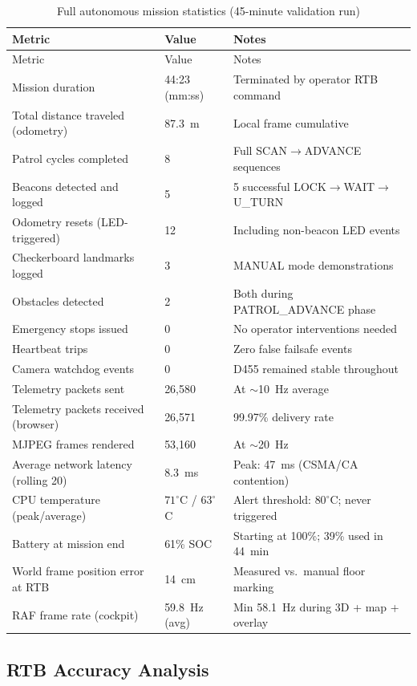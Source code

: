 \begin{longtable}{@{}p{5cm}p{2.6cm}p{5.8cm}@{}}
\caption{Full autonomous mission statistics (45-minute validation run)} \label{tab:full-mission-stats} \\
\toprule
Metric & Value & Notes \\
\midrule
\endfirsthead
\toprule
Metric & Value & Notes \\
\midrule
\endhead
Mission duration & 44:23 (mm:ss) & Terminated by operator RTB command \\
Total distance traveled (odometry) & 87.3~m & Local frame cumulative \\
Patrol cycles completed & 8 & Full SCAN$\to$ADVANCE sequences \\
Beacons detected and logged & 5 & 5 successful LOCK$\to$WAIT$\to$U\_TURN \\
Odometry resets (LED-triggered) & 12 & Including non-beacon LED events \\
Checkerboard landmarks logged & 3 & MANUAL mode demonstrations \\
Obstacles detected & 2 & Both during PATROL\_ADVANCE phase \\
Emergency stops issued & 0 & No operator interventions needed \\
Heartbeat trips & 0 & Zero false failsafe events \\
Camera watchdog events & 0 & D455 remained stable throughout \\
Telemetry packets sent & 26,580 & At $\sim$10~Hz average \\
Telemetry packets received (browser) & 26,571 & 99.97\% delivery rate \\
MJPEG frames rendered & 53,160 & At $\sim$20~Hz \\
Average network latency (rolling 20) & 8.3~ms & Peak: 47~ms (CSMA/CA contention) \\
CPU temperature (peak/average) & $71^\circ$C / $63^\circ$C & Alert threshold: $80^\circ$C; never triggered \\
Battery at mission end & 61\% SOC & Starting at 100\%; 39\% used in 44~min \\
World frame position error at RTB & 14~cm & Measured vs.\ manual floor marking \\
RAF frame rate (cockpit) & 59.8~Hz (avg) & Min 58.1~Hz during 3D + map + overlay \\
\bottomrule
\end{longtable}

\subsection{RTB Accuracy Analysis}


